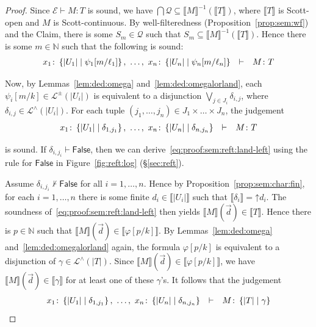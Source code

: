 \documentclass[%
  a4paper,
  UKenglish,
  cleveref,
  autoref,
  thm-restate,
  numberwithinsect,
]{lipics-v2021}
\newcommand\sle\subseteq
\newcommand\thesis{\vdash}
\newcommand\up{\mathord{\uparrow}}
\newcommand\NN{\mathbb{N}}
\newcommand\I[1]{\llbracket #1 \rrbracket} %
\newcommand\temp[1]{\mathsf{#1}}
\newcommand\False{\temp{False}}
\newcommand\Env{\mathcal{E}}    %
\newcommand\reft[1]{\left\{ #1 \right\}}
\newcommand\RT{T}               %
\newcommand\RTbis{U}            %
\newcommand\UPT[1]{\vert #1 \vert}        %
\newcommand\itvar{k}
\newcommand\itvarbis{\ell}
\newcommand\Lang{\mathcal{L}}
\begin{document}
\begin{proof}
Since $\Env \thesis M \colon \RT$ is sound, we have
$\bigcap \mathcal{Q} \sle \I M^{-1}(\I\RT)$,
where $\I\RT$ is Scott-open and $M$ is Scott-continuous.
By well-filteredness (Proposition~\ref{prop:sem:wf}) and the Claim,
there is some $S_m \in \mathcal{Q}$ such that
$S_m \sle \I M^{-1}(\I\RT)$.
Hence there is some $m \in \NN$ such that the following is sound:
\begin{equation}
\label{eq:proof:sem:reft:neutral-left}
\begin{array}{l l l}
  x_1 \colon \reft{\UPT{\RTbis_1} \mid \psi_1[m / \itvarbis_1]}
  ,~ \dots,~
  x_n \colon \reft{\UPT{\RTbis_n} \mid \psi_n[m / \itvarbis_n]}
& \thesis
& M \colon \RT
\end{array}
\end{equation}

Now, by Lemmas~\ref{lem:ded:omega} and~\ref{lem:ded:omegalorland},
each $\psi_i[m/\itvar] \in \Lang^\pm(\UPT{\RTbis_i})$
is equivalent to a disjunction $\bigvee_{j \in J_i} \delta_{i,j}$,
where $\delta_{i,j} \in \Lang^\land(\UPT{\RTbis_i})$.
For each tuple $(j_1,\dots,j_n) \in J_1 \times \dots \times J_n$,
the judgement
\begin{equation}
\label{eq:proof:sem:reft:land-left}
\begin{array}{l l l}
  x_1 \colon \reft{\UPT{\RTbis_1} \mid \delta_{1,j_1}}
  ,~ \dots,~
  x_n \colon \reft{\UPT{\RTbis_n} \mid \delta_{n,j_n}}
& \thesis
& M \colon \RT
\end{array}
\end{equation}

\noindent
is sound.
%
If $\delta_{i,j_i} \thesis \False$, then we can
derive~\eqref{eq:proof:sem:reft:land-left}
using the rule for $\False$ in Figure~\ref{fig:reft:log} (\S\ref{sec:reft}).

Assume $\delta_{i,j_i} \not\thesis \False$ for all $i = 1,\dots,n$.
Hence by Proposition~\ref{prop:sem:char:fin},
for each $i = 1,\dots,n$
there is some finite $d_i \in \I{\UPT{\RTbis_i}}$
such that $\I{\delta_i} = \up d_i$.
The soundness of~\eqref{eq:proof:sem:reft:land-left}
then yields
$\I M(\vec d) \in \I\RT$.
%
Hence there is $p \in \NN$ such that $\I M(\vec d) \in \I{\varphi[p / \itvar]}$.
By Lemmas~\ref{lem:ded:omega} and~\ref{lem:ded:omegalorland} again,
the formula $\varphi[p / \itvar]$ is equivalent to a disjunction
of $\gamma \in \Lang^\land(\UPT\RT)$.
Since $\I M(\vec d) \in \I{\varphi[p / \itvar]}$,
we have $\I M(\vec d) \in \I{\gamma}$ for at least one of these $\gamma$'s.
%
It follows that the judgement 
\[
\begin{array}{l l l}
  x_1 \colon \reft{\UPT{\RTbis_1} \mid \delta_{1,j_1}}
  ,~ \dots,~
  x_n \colon \reft{\UPT{\RTbis_n} \mid \delta_{n,j_n}}
& \thesis
& M \colon \reft{\UPT\RT \mid \gamma}
\end{array}
\]


\end{proof}
\end{document}
